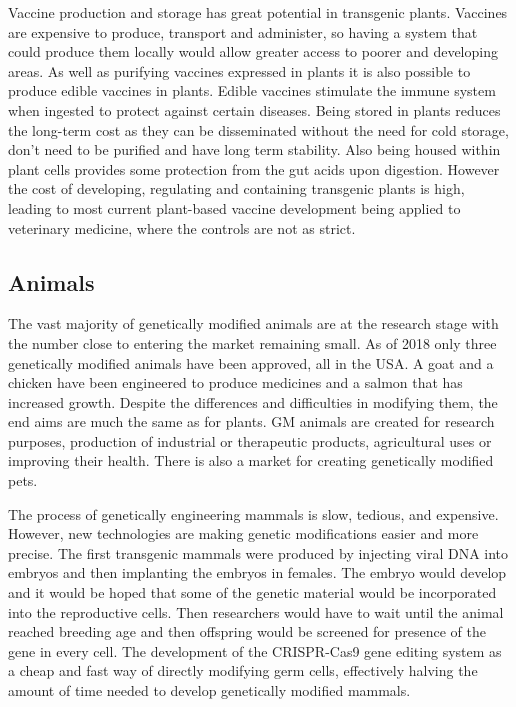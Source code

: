 Vaccine production and storage has great potential in transgenic plants. Vaccines are expensive to produce, transport and administer, so having a system that could produce them locally would allow greater access to poorer and developing areas. As well as purifying vaccines expressed in plants it is also possible to produce edible vaccines in plants. Edible vaccines stimulate the immune system when ingested to protect against certain diseases. Being stored in plants reduces the long-term cost as they can be disseminated without the need for cold storage, don't need to be purified and have long term stability. Also being housed within plant cells provides some protection from the gut acids upon digestion. However the cost of developing, regulating and containing transgenic plants is high, leading to most current plant-based vaccine development being applied to veterinary medicine, where the controls are not as strict.

\hypertarget{animals}{%
\subsection{Animals}\label{animals}}

The vast majority of genetically modified animals are at the research stage with the number close to entering the market remaining small. As of 2018 only three genetically modified animals have been approved, all in the USA. A goat and a chicken have been engineered to produce medicines and a salmon that has increased growth. Despite the differences and difficulties in modifying them, the end aims are much the same as for plants. GM animals are created for research purposes, production of industrial or therapeutic products, agricultural uses or improving their health. There is also a market for creating genetically modified pets.

The process of genetically engineering mammals is slow, tedious, and expensive. However, new technologies are making genetic modifications easier and more precise. The first transgenic mammals were produced by injecting viral DNA into embryos and then implanting the embryos in females. The embryo would develop and it would be hoped that some of the genetic material would be incorporated into the reproductive cells. Then researchers would have to wait until the animal reached breeding age and then offspring would be screened for presence of the gene in every cell. The development of the CRISPR-Cas9 gene editing system as a cheap and fast way of directly modifying germ cells, effectively halving the amount of time needed to develop genetically modified mammals.

